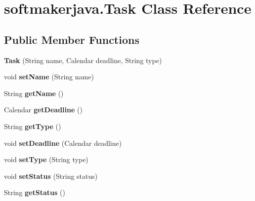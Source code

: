 \hypertarget{classsoftmakerjava_1_1_task}{}\section{softmakerjava.\+Task Class Reference}
\label{classsoftmakerjava_1_1_task}
\subsection*{Public Member Functions}
\begin{DoxyCompactItemize}
\item 
{\bfseries Task} (String name, Calendar deadline, String type)\hypertarget{classsoftmakerjava_1_1_task_adcd90fe2c7b6e296757c02cd7b93b355}{}\label{classsoftmakerjava_1_1_task_adcd90fe2c7b6e296757c02cd7b93b355}

\item 
void {\bfseries set\+Name} (String name)\hypertarget{classsoftmakerjava_1_1_task_a913f199ef73676529e6cd28cf3bc8cdb}{}\label{classsoftmakerjava_1_1_task_a913f199ef73676529e6cd28cf3bc8cdb}

\item 
String {\bfseries get\+Name} ()\hypertarget{classsoftmakerjava_1_1_task_aa88cc75b950a54e529bcc0a2086c0687}{}\label{classsoftmakerjava_1_1_task_aa88cc75b950a54e529bcc0a2086c0687}

\item 
Calendar {\bfseries get\+Deadline} ()\hypertarget{classsoftmakerjava_1_1_task_a935e974898f4d00b79bfc33b3f4dbc25}{}\label{classsoftmakerjava_1_1_task_a935e974898f4d00b79bfc33b3f4dbc25}

\item 
String {\bfseries get\+Type} ()\hypertarget{classsoftmakerjava_1_1_task_a5079c681e7f5f8b081c8e89276094bfa}{}\label{classsoftmakerjava_1_1_task_a5079c681e7f5f8b081c8e89276094bfa}

\item 
void {\bfseries set\+Deadline} (Calendar deadline)\hypertarget{classsoftmakerjava_1_1_task_a4171a9457ff8baa8c629a0fd5b4f4295}{}\label{classsoftmakerjava_1_1_task_a4171a9457ff8baa8c629a0fd5b4f4295}

\item 
void {\bfseries set\+Type} (String type)\hypertarget{classsoftmakerjava_1_1_task_a9575eff2b44c05df71b953112dd9b8c2}{}\label{classsoftmakerjava_1_1_task_a9575eff2b44c05df71b953112dd9b8c2}

\item 
void {\bfseries set\+Status} (String status)\hypertarget{classsoftmakerjava_1_1_task_a270d94ca0ed5bcc3d9c03fc2fcab7b1e}{}\label{classsoftmakerjava_1_1_task_a270d94ca0ed5bcc3d9c03fc2fcab7b1e}

\item 
String {\bfseries get\+Status} ()\hypertarget{classsoftmakerjava_1_1_task_ace5d3de273f4fa7d33f6890a6f6e98f9}{}\label{classsoftmakerjava_1_1_task_ace5d3de273f4fa7d33f6890a6f6e98f9}

\end{DoxyCompactItemize}
